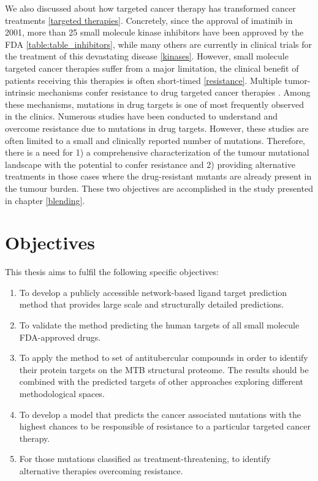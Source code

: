 \documentclass[12pt, b5paper,twoside]{tesi_upf}
\begin{document}
\par We also discussed about how targeted cancer therapy has transformed cancer treatments \ref{targeted therapies}. Concretely, since the approval of imatinib in 2001, more than 25 small molecule kinase inhibitors have been approved by the FDA \ref{table:table_inhibitors}, while many others are currently in clinical trials for the treatment of this devastating disease \ref{kinases}. However, small molecule targeted cancer therapies suffer from a major limitation, the clinical benefit of patients receiving this therapies is often short-timed \ref{resistance}. Multiple tumor-intrinsic mechanisms confer resistance to drug targeted cancer therapies \cite{Holohan2013}. Among these mechanisms, mutations in drug targets is one of most frequently observed in the clinics. Numerous studies have been conducted to understand and overcome resistance due to mutations in drug targets. However, these studies are often limited to a small and clinically reported number of mutations. Therefore, there is a need for 1) a comprehensive characterization of the tumour mutational landscape with the potential to confer resistance and 2) providing alternative treatments in those cases where the drug-resistant mutants are already present in the tumour burden. These two objectives are accomplished in the study presented in chapter \ref{blending}. 

\section{Objectives}


This thesis aims to fulfil the following specific objectives: 


\begin{enumerate}[label=\roman*]

\item To develop a publicly accessible network-based ligand target prediction method that provides large scale and structurally detailed predictions. 

\item To validate the method predicting the human targets of all small molecule FDA-approved drugs. 

\item To apply the method to set of antitubercular compounds in order to identify their protein targets on the MTB structural proteome. The results should be combined with the predicted targets of other approaches exploring different methodological spaces.  
 
\item To develop a model that predicts the cancer associated mutations with the highest chances to be responsible of resistance to a  particular targeted cancer therapy. 

\item For those mutations classified as treatment-threatening, to identify alternative therapies overcoming resistance.


\end{enumerate}
\end{document}
